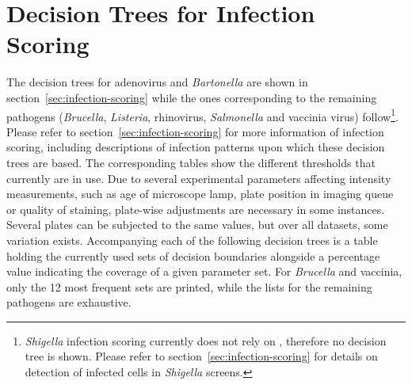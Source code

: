 \section{Decision Trees for Infection Scoring}
\label{sec:app-dectree}
The decision trees for adenovirus and \textit{Bartonella} are shown in section~\ref{sec:infection-scoring} while the ones corresponding to the remaining pathogens (\textit{Brucella}, \textit{Listeria}, rhino\-virus, \textit{Salmonella} and vaccinia virus) follow\footnote{\textit{Shigella} infection scoring currently does not rely on , therefore no decision tree is shown. Please refer to section~\ref{sec:infection-scoring} for details on detection of infected cells in \textit{Shigella} screens.}. Please refer to section~\ref{sec:infection-scoring} for more information of infection scoring, including descriptions of infection patterns upon which these decision trees are based. The corresponding tables show the different thresholds that currently are in use. Due to several experimental parameters affecting intensity measurements, such as age of microscope lamp, plate position in imaging queue or quality of staining, plate-wise adjustments are necessary in some instances. Several plates can be subjected to the same values, but over all datasets, some variation exists. Accompanying each of the following decision trees is a table holding the currently used sets of decision boundaries alongside a percentage value indicating the coverage of a given parameter set. For \textit{Brucella} and vaccinia, only the 12 most frequent sets are printed, while the lists for the remaining pathogens are exhaustive.

